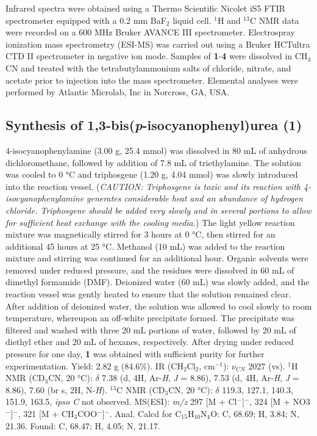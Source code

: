 Infrared spectra were obtained using a Thermo Scientific Nicolet iS5 FTIR spectrometer equipped with a 0.2 mm BaF$_{2}$ liquid cell. $^{1}$H and $^{13}$C NMR data were recorded on a 600 MHz Bruker AVANCE III spectrometer. Electrospray ionization mass spectrometry (ESI-MS) was carried out using a Bruker HCTultra CTD II spectrometer in negative ion mode. Samples of \textbf{1}-\textbf{4} were dissolved in CH$_{3}$CN and treated with the tetrabutylammonium salts of chloride, nitrate, and acetate prior to injection into the mass spectrometer. Elemental analyses were performed by Atlantic Microlab, Inc in Norcross, GA, USA. 

\subsection{Synthesis of 1,3-bis(\textit{p}-isocyanophenyl)urea (\textbf{1})}
4-isocyanophenylamine (3.00 g, 25.4 mmol) was dissolved in 80 mL of anhydrous dichloromethane, followed by addition of 7.8 mL of triethylamine. The solution was cooled to 0 °C and triphosgene (1.20 g, 4.04 mmol) was slowly introduced into the reaction vessel. (\textit{CAUTION: Triphosgene is toxic and its reaction with 4-isocyanophenylamine generates considerable heat and an abundance of hydrogen chloride. Triphosgene should be added very slowly and in several portions to allow for sufficient heat exchange with the cooling media.}) The light yellow reaction mixture was magnetically stirred for 3 hours at 0 °C, then stirred for an additional 45 hours at 25 °C. Methanol (10 mL) was added to the reaction mixture and stirring was continued for an additional hour.
Organic solvents were removed under reduced pressure, and the residues were dissolved in 60 mL of dimethyl formamide (DMF). Deionized water (60 mL) was slowly added, and the reaction vessel was gently heated to ensure that the solution remained clear. After addition of deionized water, the solution was allowed to cool slowly to room temperature, whereupon an off-white precipitate formed. The precipitate was filtered and washed with three 20 mL portions of water, followed by 20 mL of diethyl ether and 20 mL of hexanes, respectively. After drying under reduced pressure for one day,  \textbf{1} was obtained with sufficient purity for further experimentation. 
Yield: 2.82 g (84.6\%). IR (CH$_{2}$Cl$_{2}$, cm$^{-1}$): $\nu_{CN}$ 2027 (vs). 
$^{1}$H NMR (CD$_{3}$CN, 20 °C): $\delta$ 7.38 (d, 4H, Ar-\textit{H}, \textit{J} = 8.86), 7.53 (d, 4H, Ar-\textit{H}, \textit{J} = 8.86), 7.60 (br s, 2H, N-\textit{H}). $^{13}$C NMR (CD$_{3}$CN, 20 °C): $\delta$ 119.3, 127.1, 140.3, 151.9, 163.5, \textit{ipso C} not observed. MS(ESI): \textit{m/z} 297 [M + Cl$^{-}$]$^{-}$, 324 [M + NO3$^{-}$]$^{-}$, 321 [M + CH$_{3}$COO$^{-}$]$^{-}$. Anal. Calcd for C$_{15}$H$_{10}$N$_{4}$O: C, 68.69; H, 3.84; N, 21.36. Found: C, 68.47; H, 4.05; N, 21.17.            

